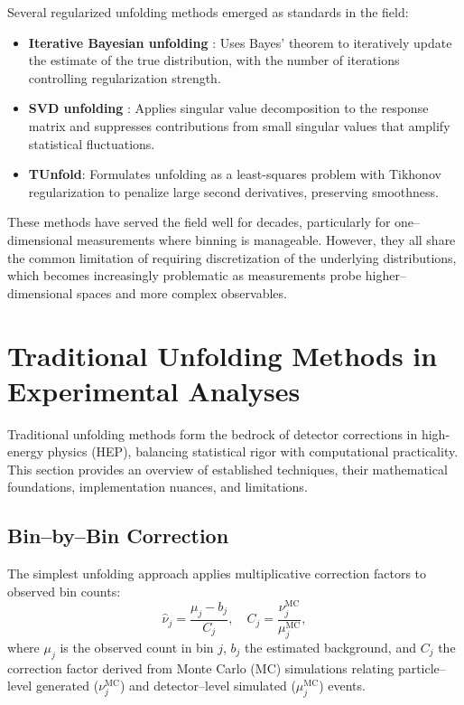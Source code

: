 Several regularized unfolding methods emerged as standards in the field:

\begin{itemize}
\item \textbf{Iterative Bayesian unfolding} : Uses Bayes' theorem to iteratively update the estimate of the true distribution, with the number of iterations controlling regularization strength.
\item \textbf{SVD unfolding} : Applies singular value decomposition to the response matrix and suppresses contributions from small singular values that amplify statistical fluctuations.
\item \textbf{TUnfold}: Formulates unfolding as a least-squares problem with Tikhonov regularization to penalize large second derivatives, preserving smoothness.
\end{itemize}

These methods have served the field well for decades, particularly for one--dimensional measurements where binning is manageable.
%
However, they all share the common limitation of requiring discretization of the underlying distributions, which becomes increasingly problematic as measurements probe higher--dimensional spaces and more complex observables.


\section{Traditional Unfolding Methods in Experimental Analyses}
\label{sec:binned-methods}
Traditional unfolding methods form the bedrock of detector corrections in high-energy physics (HEP), balancing statistical rigor with computational practicality.
%
This section provides an overview of established techniques, their mathematical foundations, implementation nuances, and limitations.

\subsection{Bin--by--Bin Correction}  
The simplest unfolding approach applies multiplicative correction factors to observed bin counts:  
\begin{equation}
    \hat{\nu}_j = \frac{\mu_j - b_j}{C_j}, \quad C_j = \frac{\nu^{\text{MC}}_j}{\mu^{\text{MC}}_j},
\end{equation}  
where \(\mu_j\) is the observed count in bin \(j\), \(b_j\) the estimated background, and \(C_j\) the correction factor derived from Monte Carlo (MC) simulations relating particle--level generated (\(\nu^{\text{MC}}_j\)) and detector--level simulated (\(\mu^{\mathrm{MC}}_j\)) events. 

